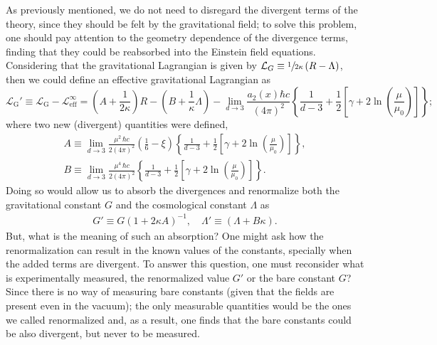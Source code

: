 As previously mentioned, we do not need to disregard the divergent terms of the theory, since they should be felt by the gravitational field; to solve this problem, one should pay attention to the geometry dependence of the divergence terms, finding that they could be reabsorbed into the Einstein field equations. Considering that the gravitational Lagrangian is given by $\mathcal{L}_G\equiv \sfrac{1}{2\kappa}\left(R-\Lambda\right)$, then we could define an effective gravitational Lagrangian as 
\begin{equation}
	\mathcal{L}_{\text{G}}'\equiv\mathcal{L}_{\text{G}}-\mathcal{L}_{\text{eff}}^\infty=\left(A+\frac{1}{2\kappa}\right)R-\left(B+\frac{1}{\kappa}\Lambda\right)-\lim\limits_{d\to 3}\frac{a_2(x)\hbar c}{(4\pi)^2}\left\{\frac{1}{d-3}+\frac{1}{2}\left[\gamma+2\ln\left(\frac{\mu}{\mu_0}\right)\right]\right\};
\end{equation}
where two new (divergent) quantities were defined, 
\begin{subequations}\label{eq: Effective Gravitational lagrangian}
	\begin{gather}
		A\equiv \lim\limits_{d\to 3}\frac{\mu^2\,\hbar c}{2(4\pi)^2}\left(\frac{1}{6}-\xi\right)\left\{\frac{1}{d-3}+\frac{1}{2}\left[\gamma+2\ln\left(\frac{\mu}{\mu_0}\right)\right]\right\},\tag{\theequation \,\,a}\\
		B\equiv \lim\limits_{d\to 3}\frac{\mu^4\,\hbar c}{2(4\pi)^2}\left\{\frac{1}{d-3}+\frac{1}{2}\left[\gamma+2\ln\left(\frac{\mu}{\mu_0}\right)\right]\right\}.\tag{\theequation \,\,b}
	\end{gather}
\end{subequations}
Doing so would allow us to absorb the divergences and renormalize both the gravitational constant $G$ and the cosmological constant $\Lambda$ as
\begin{subequations}
	\begin{gather}
		G'\equiv G\left(1+2\kappa A\right)^{-1},\quad \Lambda'\equiv \left(\Lambda+B\kappa\right).\tag{\theequation \,\,a,b}
	\end{gather}
\end{subequations}
But, what is the meaning of such an absorption? One might ask how the renormalization can result in the known values of the constants, specially when the added terms are divergent. To answer this question, one must reconsider what is experimentally measured, the renormalized value $G'$ or the bare constant $G$? Since there is no way of measuring bare constants (given that the fields are present even in the vacuum); the only measurable quantities would be the ones we called renormalized and, as a result, one finds that the bare constants could be also divergent, but never to be measured.  

